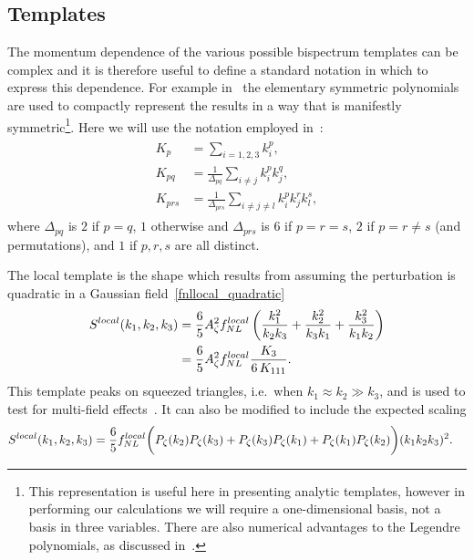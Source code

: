     \subsection{Templates}
    The momentum dependence of the various possible bispectrum templates can be complex
    and it is therefore useful to define a standard notation in which to express this dependence.
    For example in~\cite{Fergusson_2010, Pajer_boostless_2020} the elementary
    symmetric polynomials are used to compactly represent the results in a way that is manifestly
    symmetric\footnote{This representation is useful here in presenting analytic templates, however in performing
    our calculations we will require a one-dimensional basis, not a basis in three variables.
    There are also numerical advantages to the Legendre polynomials, as discussed in~\cite{Fergusson_2010}.}.
    Here we will use the notation employed in~\cite{FergShell_2}:
\begin{align}\label{shape_notation}
\begin{split}
    K_p &= \sum_{i=1,2,3} k_i^p, \\
    K_{pq} &= \frac{1}{\Delta_{pq}}\sum_{i\neq j} k_i^p k_j^q,   \\
    K_{prs} &= \frac{1}{\Delta_{prs}}\sum_{i\neq j\neq l} k_i^p k_j^r k_l^s,
\end{split}
\end{align}
where $\Delta_{pq}$ is $2$ if $p=q$, $1$ otherwise
and $\Delta_{prs}$ is $6$ if $p=r=s$, $2$ if $p=r\neq s$ (and permutations),
and $1$ if $p,r,s$ are all distinct.


    The local template is the shape which results from assuming the perturbation is
    quadratic in a Gaussian field~\eqref{fnllocal_quadratic}
\begin{align}\label{local_shape}
S^{local}(k_1,k_2,k_3)
    &= \frac{6}{5}A_\zeta^2f^{local}_{NL}\left(\frac{k_1^2}{k_2k_3}+\frac{k_2^2}{k_3k_1}+\frac{k_3^2}{k_1k_2}\right)\\
    &= \frac{6}{5}A_\zeta^2f^{local}_{NL}\frac{K_3}{6\,K_{111}}.
\end{align}
This template peaks on squeezed triangles, i.e.\ when $k_1\approx k_2\gg k_3$,
and is used to test for multi-field effects~\cite{Planck_NG_2015}.
It can also be modified to include the expected scaling
\begin{align}
S^{local}(k_1,k_2,k_3)
    &= \frac{6}{5}f^{local}_{NL}\bigg(
        P_\zeta(k_2)P_\zeta(k_3)
        +P_\zeta(k_3)P_\zeta(k_1)
        +P_\zeta(k_1)P_\zeta(k_2)
    \bigg)(k_1k_2k_3)^2.
\end{align}


